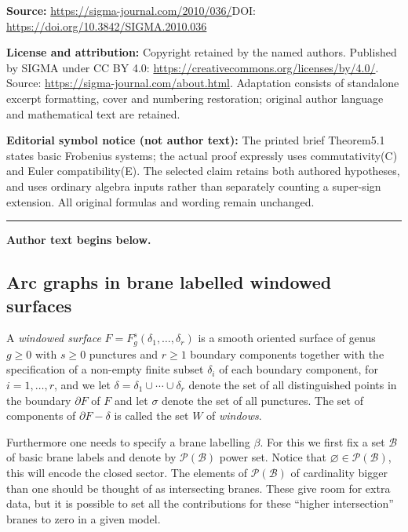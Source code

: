 \documentclass[11pt]{article}
\def\calB{{\mathcal B}}
\def\calP{{\mathcal P}}
\begin{document}
\noindent\textbf{Source:} \url{https://sigma-journal.com/2010/036/}\quad DOI: \url{https://doi.org/10.3842/SIGMA.2010.036}\par
\noindent\textbf{License and attribution:} Copyright retained by the named authors. Published by SIGMA under CC BY 4.0: \url{https://creativecommons.org/licenses/by/4.0/}. Source: \url{https://sigma-journal.com/about.html}. Adaptation consists of standalone excerpt formatting, cover and numbering restoration; original author language and mathematical text are retained.\par
\noindent\textbf{Editorial symbol notice (not author text):} The printed brief Theorem5.1 states basic Frobenius systems; the actual proof expressly uses commutativity(C) and Euler compatibility(E). The selected claim retains both authored hypotheses, and uses ordinary algebra inputs rather than separately counting a super-sign extension. All original formulas and wording remain unchanged.\par
\medskip\hrule\medskip\noindent\textbf{Author text begins below.}\par
\setcounter{section}{2}
\setcounter{subsection}{0}
\setcounter{subsubsection}{0}
\setcounter{thm}{0}
\setcounter{equation}{0}
\subsection{Arc graphs in brane labelled windowed surfaces}

A {\it windowed surface} $F=F^s_g(\delta_1,\ldots ,\delta _r)$ is a
smooth oriented surface of genus $g\geq 0$ with $s\geq 0$ punctures and
$r\geq 1$ boundary components together with the specif\/ication of a
non-empty f\/inite subset $\delta _i$ of each boundary component,
for $i=1,\ldots ,r$, and we let $\delta =\delta
_1\cup\cdots\cup\delta _r$ denote the set of all distinguished points in the boundary
$\partial F$ of $F$ and let  $\sigma$ denote the set of all punctures.
The set of components of
$\partial F-\delta$ is called the set $W$ of {\it windows}.

Furthermore one needs to specify a brane labelling $\beta$.
For this we f\/irst f\/ix a set $\calB$ of basic brane labels
and denote by $\calP(\calB)$  power set.  Notice that $\varnothing\in\calP(\calB) $,
this will encode the closed sector. The elements of $\calP(\calB)$ of cardinality
bigger than one should be thought of as intersecting branes. These
give room for extra data, but it is possible to set all the contributions
for these  ``higher intersection'' branes
to zero in a given model.
\end{document}

